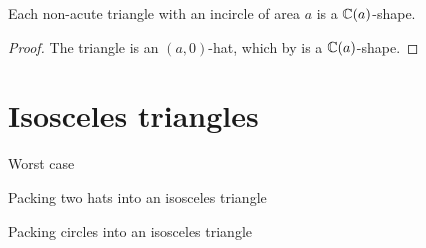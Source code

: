 \documentclass[a4paper,style=print,bibliography=totoc,nexus,lnum,extramargin]{tubsbook}
\begin{document}
\begin{theorem}
    Each non-acute triangle with an incircle of area $a$ is a $\mathbb{C}(a)$-shape.
\end{theorem}

\begin{proof}
    The triangle is an $(a,0)$-hat, which by  is a $\mathbb{C}(a)$-shape.
\end{proof}

\section{Isosceles triangles}

Worst case

Packing two hats into an isosceles triangle

Packing circles into an isosceles triangle

%
%
%
%
%
%
%
\end{document}
